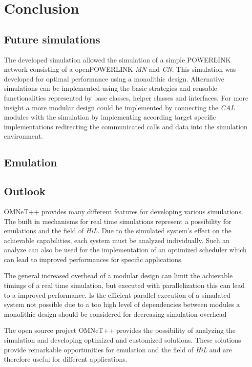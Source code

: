 \chapter{Conclusion}
\label{cha:conclusion}

\section{Future simulations}
\label{sec:conclusion_futuresim}
The developed simulation allowed the simulation of a simple POWERLINK network consisting of a openPOWERLINK \emph{MN} and \emph{CN}.
This simulation was developed for optimal performance using a monolithic design.
Alternative simulations can be implemented using the basic strategies and reusable functionalities represented by base classes, helper classes and interfaces.
For more insight a more modular design could be implemented by connecting the \emph{CAL} modules with the simulation by implementing according target specific implementations redirecting the communicated calls and data into the simulation environment.

\section{Emulation}
\label{sec:conclusion_emulation}



\section{Outlook}
\label{sec:conclusion_outlook}


OMNeT++ provides many different features for developing various simulations.
The built in mechanisms for real time simulations represent a possibility for emulations and the field of \emph{HiL}.
Due to the simulated system's effect on the achievable capabilities, each system must be analyzed individually.
Such an analyze can also be used for the implementation of an optimized scheduler which can lead to improved performances for specific applications.


The general increased overhead of a modular design can limit the achievable timings of a real time simulation, but executed with parallelization this can lead to a improved performance.
Is the efficient parallel execution of a simulated system not possible due to a too high level of dependencies between modules a monolithic design should be considered for decreasing simulation overhead


The open source project OMNeT++ provides the possibility of analyzing the simulation and developing optimized and customized solutions.
These solutions provide remarkable opportunities for emulation and the field of \emph{HiL} and are therefore useful for different applications.